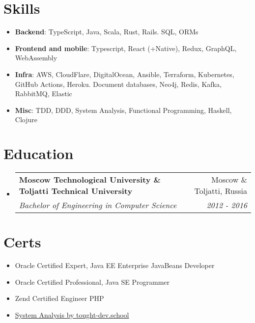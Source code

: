 \documentclass[letterpaper,10pt]{article}
\makeatletter
\newcommand{\resumeItem}[2]{
  \item\small{
    \textbf{#1}{: #2 \vspace{-2pt}}
  }
}
\newcommand{\resumeSubheading}[4]{
  \vspace{-1pt}\item
    \begin{tabular*}{0.97\textwidth}[t]{l@{\extracolsep{\fill}}r}
      \textbf{#1} & #2 \\
      \textit{\small#3} & \textit{\small #4} \\
    \end{tabular*}\vspace{-5pt}
}
\newcommand{\resumeSubItem}[2]{\resumeItem{#1}{#2}\vspace{-4pt}}
\newcommand{\resumeSubHeadingListStart}{\begin{itemize}[leftmargin=*]}
\newcommand{\resumeSubHeadingListEnd}{\end{itemize}}
\makeatother
\begin{document}

%
\section{Skills}
  \resumeSubHeadingListStart
    \item{
      \textbf{Backend}{: TypeScript, Java, Scala, Rust, Rails. SQL, ORMs}
      \hfill
    }
    \item{
      \textbf{Frontend and mobile}{: Typescript, React (+Native), Redux, GraphQL, WebAssembly}
      \hfill
    }
    \item{
      \textbf{Infra}{: AWS, CloudFlare, DigitalOcean, Ansible, Terraform, Kubernetes, GitHub Actions, Heroku. Document databases, Neo4j, Redis, Kafka, RabbitMQ, Elastic}
      \hfill
    }
    \item{
      \textbf{Misc}{: TDD, DDD, System Analysis, Functional Programming, Haskell, Clojure}
    }
  \resumeSubHeadingListEnd

\section{Education}
  \resumeSubHeadingListStart
    \resumeSubheading
      {Moscow Technological University \& Toljatti Technical University}{Moscow \& Toljatti, Russia}
      {Bachelor of Engineering in Computer Science}{2012 - 2016}
  \resumeSubHeadingListEnd

  \section{Certs}
    \resumeSubHeadingListStart
      \item
        {Oracle Certified Expert, Java EE Enterprise JavaBeans Developer}
      \item
        {Oracle Certified Professional, Java SE Programmer}
      \item
        {Zend Certified Engineer PHP}
      \item
        \href{https://cert.tough-dev.school/eS8vL3fj6ZMuKuBvqcpKQS/en}{System Analysis by tought-dev.school}
    \resumeSubHeadingListEnd


\end{document}
